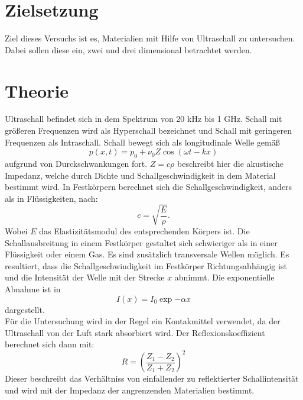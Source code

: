 \section{Zielsetzung}
Ziel dieses Versuchs ist es, Materialien mit Hilfe von Ultraschall zu untersuchen.
Dabei sollen diese ein, zwei und drei dimensional betrachtet werden.
\section{Theorie}
\label{sec:Theorie}
Ultraschall befindet sich in dem Spektrum von 20 kHz bis 1 GHz.
Schall mit größeren Frequenzen wird als Hyperschall bezeichnet und Schall mit geringeren Frequenzen als Intraschall.
Schall bewegt sich als longitudinale Welle gemäß
\begin{equation}
  p(x,t) = p_0 + \nu_0 Z \cos{(\omega t - k x)}
\end{equation}
 aufgrund von Durckschwankungen fort.
 $Z=c \rho$ beschreibt hier die akustische Impedanz, welche durch Dichte und Schallgeschwindigkeit in dem Material bestimmt wird.
 In Festkörpern berechnet sich die Schallgeschwindigkeit, anders als in Flüssigkeiten, nach:
 \begin{equation}
  c=\sqrt{\frac{E}{\rho}}   .
 \end{equation}
Wobei $E$ das Elastizitätsmodul des entsprechenden Körpers ist.
Die Schallausbreitung in einem Festkörper gestaltet sich schwieriger als in einer Flüssigkeit oder einem Gas.
Es sind zusätzlich transversale Wellen möglich.
Es resultiert, dass die Schallgeschwindigkeit im Festkörper Richtungsabhängig ist und die Intensität der Welle mit der Strecke $x$ abnimmt.
Die exponentielle Abnahme ist in
\begin{equation}
  I(x) = I_0 \exp{- \alpha x}
\end{equation}
dargestellt.
\\Für die Untersuchung wird in der Regel ein Kontakmittel verwendet, da der Ultraschall von der Luft stark absorbiert wird.
Der Reflexionskoeffizient berechnet sich dann mit:
\begin{equation}
  R=\left(\frac{Z_1 - Z_2}{Z_1 + Z_2}\right)^2
\end{equation}
Dieser beschreibt das Verhältniss von einfallender zu reflektierter Schallintensität und wird mit der Impedanz der angrenzenden Materialien bestimmt.
